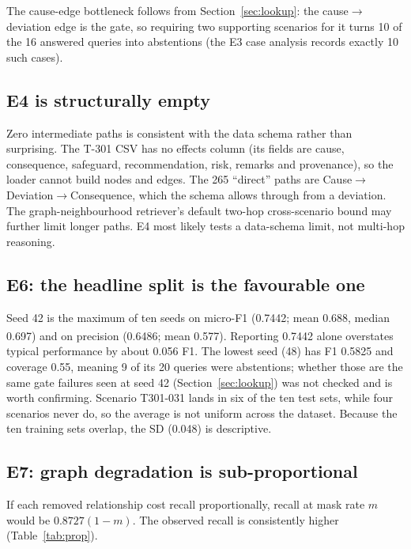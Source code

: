 \documentclass[10pt,twocolumn,a4paper]{extarticle}
\newcommand{\derived}{\textsuperscript{\textdagger}}
\begin{document}
The cause-edge bottleneck follows from Section~\ref{sec:lookup}: the cause$\to$deviation edge is the gate, so requiring two supporting scenarios for it turns 10 of the 16 answered queries into abstentions (the E3 case analysis records exactly 10 such cases).

\subsection{E4 is structurally empty}
Zero intermediate paths is consistent with the data schema rather than surprising. The T-301 CSV has no effects column (its fields are cause, consequence, safeguard, recommendation, risk, remarks and provenance), so the loader cannot build  nodes and  edges. The 265 ``direct'' paths are Cause$\to$Deviation$\to$Consequence, which the schema allows through  from a deviation. The graph-neighbourhood retriever's default two-hop cross-scenario bound may further limit longer paths. E4 most likely tests a data-schema limit, not multi-hop reasoning.

\subsection{E6: the headline split is the favourable one}
Seed 42 is the maximum of ten seeds on micro-F1 (0.7442; mean 0.688, median 0.697) and on precision (0.6486; mean 0.577).\derived{} Reporting 0.7442 alone overstates typical performance by about 0.056 F1. The lowest seed (48) has F1 0.5825 and coverage 0.55, meaning 9 of its 20 queries were abstentions; whether those are the same gate failures seen at seed 42 (Section~\ref{sec:lookup}) was not checked and is worth confirming. Scenario T301-031 lands in six of the ten test sets, while four scenarios never do, so the average is not uniform across the dataset. Because the ten training sets overlap, the SD (0.048) is descriptive.

\subsection{E7: graph degradation is sub-proportional}
If each removed relationship cost recall proportionally, recall at mask rate $m$ would be $0.8727(1-m)$. The observed recall is consistently higher (Table~\ref{tab:prop}).
\end{document}
